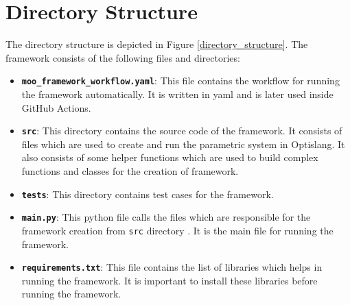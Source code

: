 \section{Directory Structure} \label{directory_structure_section}
The directory structure is depicted in Figure \ref{directory_structure}. The framework consists of the following files and directories:
\begin{itemize}
    \item \textbf{\texttt{moo\_framework\_workflow.yaml}}:\newline
    This file contains the workflow for running the framework automatically. It is written in \acrshort{yaml} and is later used inside GitHub Actions.
    \item \textbf{\texttt{src}}:\newline
    This directory contains the source code of the framework. It consists of files which are used to create and run the parametric system in Optislang. It also
    consists of some helper functions which are used to build complex functions and classes for the creation of framework. 
    \item \textbf{\texttt{tests}}:\newline
    This directory contains test cases for the framework.
    \item \textbf{\texttt{main.py}}:\newline
    This python file calls the files which are responsible for the framework creation from  \texttt{src} directory . It is the main file for running the framework.
    \item \textbf{\texttt{requirements.txt}}:\newline
    This file contains the list of libraries which helps in running the framework. It is important to install these libraries before running the framework.
\end{itemize}
\newpage
